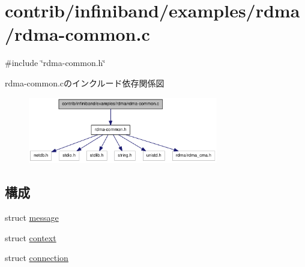 \hypertarget{rdma-common_8c}{
\section{contrib/infiniband/examples/rdma/rdma-\/common.c}
\label{rdma-common_8c}
}
{\ttfamily \#include \char`\"{}rdma-\/common.h\char`\"{}}\par
rdma-\/common.cのインクルード依存関係図\nopagebreak
\begin{figure}[H]
\begin{center}
\leavevmode
\includegraphics[width=235pt]{rdma-common_8c__incl}
\end{center}
\end{figure}
\subsection*{構成}
\begin{DoxyCompactItemize}
\item 
struct \hyperlink{structmessage}{message}
\item 
struct \hyperlink{structcontext}{context}
\item 
struct \hyperlink{structconnection}{connection}
\end{DoxyCompactItemize}
